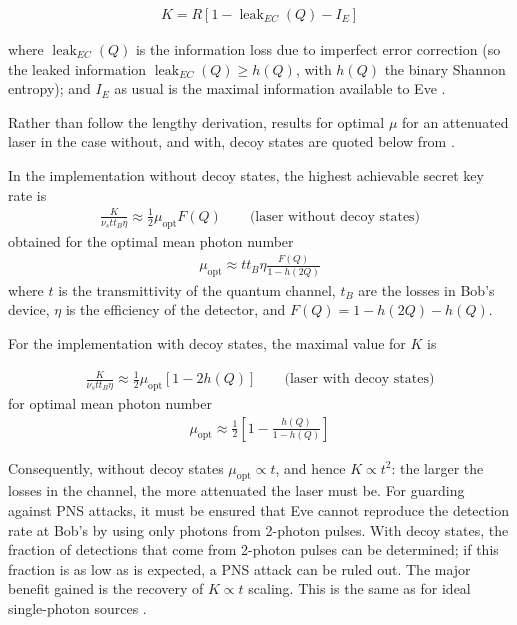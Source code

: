 \documentclass[paper=a4, fontsize=11pt]{scrartcl} %
\numberwithin{equation}{section} %
\numberwithin{figure}{section} %
\numberwithin{table}{section} %
\begin{document}
\begin{align}
	K = R\left[1-\operatorname{leak}_{EC}(Q) - I_E\right]
\end{align}

where $\operatorname{leak}_{EC}(Q)$ is the information loss due to imperfect error correction (so the leaked information
$\operatorname{leak}_{EC}(Q) \geq h(Q)$, with $h(Q)$ the binary Shannon entropy); and $I_E$ as usual is the maximal
information available to Eve \citep{reviewScariani}.

Rather than follow the lengthy derivation, results for optimal $\mu$ for an attenuated laser in the case without, and with,
decoy states are quoted below from \citet{reviewScariani}.

In the implementation without decoy states, the highest achievable secret key rate is
\begin{align}
	\frac{K}{\nu_s t t_B \eta}
	\approx
	\frac{1}{2}
	\mu_{\mathrm{opt}} F(Q)
	\qquad
	\text{(laser without decoy states)}
\end{align}
obtained for the optimal mean photon number
\begin{align}
	\mu_{\mathrm{opt}}
	\approx
	t t_B \eta
	\frac{F(Q)}{1-h(2Q)}
\end{align}
where $t$ is the transmittivity of the quantum channel, $t_B$ are the losses in Bob's
device, $\eta$ is the efficiency of the detector, and $F(Q) = 1 - h(2Q) - h(Q)$.

For the implementation with decoy states, the maximal value for $K$ is

\begin{align}
	\frac{K}{\nu_s t t_B \eta}
	\approx
	\frac{1}{2}
	\mu_{\mathrm{opt}}
	\left[1-2h(Q)\right]
	\qquad
	\text{(laser with decoy states)}
\end{align}
for optimal mean photon number
\begin{align}
	\mu_{\mathrm{opt}}
	\approx
	\frac{1}{2}
	\left[
	1 - \frac{h(Q)}{1-h(Q)}
	\right]
\end{align}

Consequently, without decoy states $\mu_{\mathrm{opt}} \propto t$, and hence
$K \propto t^2$: the larger the losses in the channel, the more attenuated the laser
must be. For guarding against PNS attacks, it must be ensured that Eve cannot reproduce
the detection rate at Bob's by using only photons from 2-photon pulses. With decoy states,
the fraction of detections that come from 2-photon pulses can be determined; if this fraction
is as low as is expected, a PNS attack can be ruled out. The major benefit gained is the recovery
of $K \propto t$ scaling. This is the same as for ideal single-photon sources \citep{lo2005, reviewScariani}.
\end{document}
